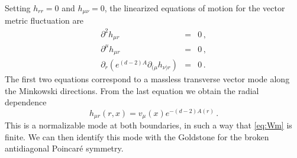 Setting $h_{rr}=0$ and $h_{\mu\nu}=0$,
the linearized equations of motion for the vector metric fluctuation are
\begin{subequations}
\begin{eqnarray}
     \partial^2 h_{\mu r} &= &0\,,\\
	\partial^\mu h_{\mu r} &= &0\,,\\
     \partial_r \left(e^{(d-2)A} \partial_{(\mu} h_{\nu) r}\right) &=&0\,.
\end{eqnarray}
\end{subequations}
The first two equations correspond to a massless transverse vector mode along the Minkowski directions.
From the last equation we obtain the radial dependence
\begin{equation}
	h_{\mu r}(r,x)=v_\mu(x) e^{-(d-2) A(r)}\,.
\end{equation}
This is a normalizable mode at both boundaries, in such a way that \cref{eq:Wm} is finite.
We can then identify this mode with the Goldstone for the broken antidiagonal Poincar\'e symmetry.

